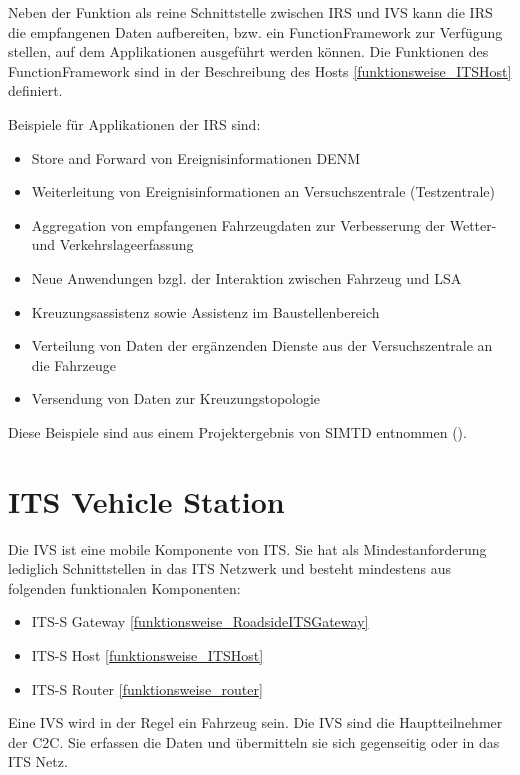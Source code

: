 Neben der Funktion als reine Schnittstelle zwischen \ac{IRS} und \ac{IVS} kann die \ac{IRS} die empfangenen Daten aufbereiten, bzw. ein FunctionFramework zur Verfügung stellen, auf dem Applikationen ausgeführt werden können. Die Funktionen des FunctionFramework sind in der Beschreibung des Hosts \ref{funktionsweise_ITSHost} definiert.  

Beispiele für Applikationen der \ac{IRS} sind:
\begin{itemize}
	\item Store and Forward von Ereignisinformationen \ac{DENM}
	\item Weiterleitung von Ereignisinformationen an Versuchszentrale (Testzentrale)
	\item Aggregation von empfangenen Fahrzeugdaten zur Verbesserung der Wetter- und Verkehrslageerfassung
	\item Neue Anwendungen bzgl. der Interaktion zwischen Fahrzeug und LSA
	\item  Kreuzungsassistenz sowie Assistenz im Baustellenbereich
	\item Verteilung von Daten der ergänzenden Dienste aus der Versuchszentrale an die Fahrzeuge
	\item Versendung von Daten zur Kreuzungstopologie
\end{itemize}

Diese Beispiele sind aus einem Projektergebnis von \ac{SIMTD} entnommen (\cite{simtd-D12.1}). 



\section{ITS Vehicle Station}
Die \ac{IVS} ist eine mobile Komponente von \ac{ITS}. Sie hat als Mindestanforderung lediglich Schnittstellen in das \ac{ITS} Netzwerk und besteht mindestens aus folgenden funktionalen Komponenten:
\begin{itemize}
	\item  \ac{ITS-S} Gateway \ref{funktionsweise_RoadsideITSGateway}
	\item \ac{ITS-S} Host \ref{funktionsweise_ITSHost}
	\item \ac{ITS-S} Router \ref{funktionsweise_router} 
\end{itemize}

Eine \ac{IVS} wird in der Regel ein Fahrzeug sein. Die \ac{IVS} sind die Hauptteilnehmer der \ac{C2C}. Sie erfassen die Daten und übermitteln sie sich gegenseitig oder in das \ac{ITS} Netz. 